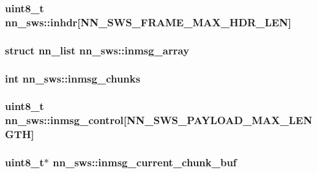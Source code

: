\subsubsection[{inhdr}]{\setlength{\rightskip}{0pt plus 5cm}uint8\+\_\+t nn\+\_\+sws\+::inhdr\mbox{[}{\bf N\+N\+\_\+\+S\+W\+S\+\_\+\+F\+R\+A\+M\+E\+\_\+\+M\+A\+X\+\_\+\+H\+D\+R\+\_\+\+L\+EN}\mbox{]}}\hypertarget{structnn__sws_a0a288b7934dcd70b5ec2e7f28a34ab9d}{}\label{structnn__sws_a0a288b7934dcd70b5ec2e7f28a34ab9d}
\subsubsection[{inmsg\+\_\+array}]{\setlength{\rightskip}{0pt plus 5cm}struct {\bf nn\+\_\+list} nn\+\_\+sws\+::inmsg\+\_\+array}\hypertarget{structnn__sws_afc2ece84443c16a9d7f355f5f69ffc66}{}\label{structnn__sws_afc2ece84443c16a9d7f355f5f69ffc66}
\subsubsection[{inmsg\+\_\+chunks}]{\setlength{\rightskip}{0pt plus 5cm}int nn\+\_\+sws\+::inmsg\+\_\+chunks}\hypertarget{structnn__sws_a86d3aac1fb485380af609c1c99a74f01}{}\label{structnn__sws_a86d3aac1fb485380af609c1c99a74f01}
\subsubsection[{inmsg\+\_\+control}]{\setlength{\rightskip}{0pt plus 5cm}uint8\+\_\+t nn\+\_\+sws\+::inmsg\+\_\+control\mbox{[}{\bf N\+N\+\_\+\+S\+W\+S\+\_\+\+P\+A\+Y\+L\+O\+A\+D\+\_\+\+M\+A\+X\+\_\+\+L\+E\+N\+G\+TH}\mbox{]}}\hypertarget{structnn__sws_ae8a7a63a27e046f091fd9178d928e05a}{}\label{structnn__sws_ae8a7a63a27e046f091fd9178d928e05a}
\subsubsection[{inmsg\+\_\+current\+\_\+chunk\+\_\+buf}]{\setlength{\rightskip}{0pt plus 5cm}uint8\+\_\+t$\ast$ nn\+\_\+sws\+::inmsg\+\_\+current\+\_\+chunk\+\_\+buf}\hypertarget{structnn__sws_a9504843df14857080a12ee7c23619d72}{}\label{structnn__sws_a9504843df14857080a12ee7c23619d72}
